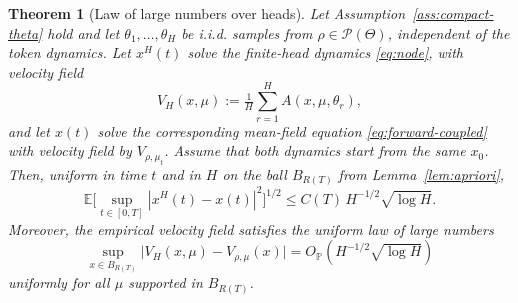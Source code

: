 \documentclass[11pt,a4wide]{article}
\newtheorem{theorem}{Theorem}[section]
\theoremstyle{definition}
\newcommand{\Prob}{\mathcal{P}}
\begin{document}
\begin{theorem}[Law of large numbers over heads]
\label{thm:head-lln}
Let Assumption~\ref{ass:compact-theta} hold and let $\theta_1,\dots,\theta_H$ be i.i.d. samples from $\rho\in\Prob(\Theta)$, independent of the token dynamics. 
Let $x^H(t)$ solve the finite-head dynamics \eqref{eq:node},  with velocity field 
$$
V_H(x, \mu):= \tfrac1H\sum_{r=1}^H  A(x, \mu, \theta_r),
$$ 
and let $x(t)$ solve the corresponding mean-field equation \eqref{eq:forward-coupled} with velocity field  by $V_{\rho,\mu_t}$. Assume that both dynamics start from the same $x_0$. Then, uniform in time $t$  and in $H$ on the ball $B_{R(T)}$ from Lemma~\ref{lem:apriori},  
\begin{equation}
\mathbb E\Big[\sup_{t\in[0,T]}|x^H(t)-x(t)|^2\Big]^{1/2} \le C(T)\,H^{-1/2}\sqrt{\log H}.
\end{equation}
Moreover, the empirical velocity field satisfies the uniform law of large numbers 
$$
\sup_{x\in B_{R(T)}}\big|V_H(x, \mu) - V_{\rho,\mu}(x)\big| = O_{\mathbb P}(H^{-1/2}\sqrt{\log H})
$$ 
uniformly for all $\mu$ supported in $B_{R(T)}$.
\end{theorem}
\end{document}
